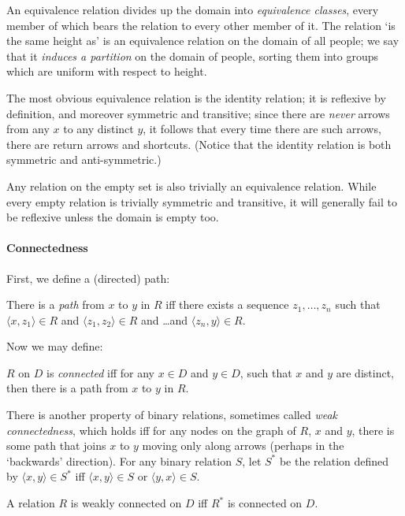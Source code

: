 An equivalence relation divides up the domain into \emph{equivalence classes}, every member of which bears the relation to every other member of it. The relation `is the same height as' is an equivalence relation on the domain of all people; we say that it \emph{induces a partition} on the domain of people, sorting them into groups which are uniform with respect to height.

The most obvious equivalence relation is the identity relation; it is reflexive by definition, and moreover symmetric and transitive; since there are \emph{never} arrows from any $x$ to any distinct $y$, it follows that every time there are such arrows, there are return arrows and shortcuts. (Notice that the identity relation is both symmetric and anti-symmetric.)

Any relation on the empty set is also trivially an equivalence relation. While every empty relation is trivially symmetric and transitive, it will generally fail to be reflexive unless the domain is empty too.

\paragraph{Connectedness}

First, we define a (directed) path: \begin{definition}[Path]
	There is a \emph{path} from $x$ to $y$ in $R$ iff there exists a sequence $z_{1},\ldots,z_{n}$ such that $\langle x,z_{1}\rangle \in R$ and
	$\langle z_{1},z_{2}\rangle \in R$ and \ldots and $\langle z_{n},y\rangle \in R$.
\end{definition}
Now we may define: \begin{definition}
 	$R$ on $D$ is \emph{connected} iff for any $x \in D$ and $y \in D$, such that $x$ and $y$ are distinct, then there is a path from $x$ to $y$ in $R$. 
 \end{definition}
 There is another property of binary relations, sometimes called \emph{weak
connectedness}, which holds iff for any nodes on the graph of $R$, $x$ and $y$, there is
some path that joins $x$ to $y$ moving only along arrows (perhaps in
the `backwards' direction). For any binary relation $S$, let $S^{*}$ be the relation defined by $\langle x,y\rangle \in S^{*}$ iff $\langle x,y\rangle \in S$ or $\langle y,x\rangle \in S$. \begin{definition}
	A relation $R$ is weakly connected on $D$ iff  $R^{*}$ is connected on $D$.
\end{definition} 

